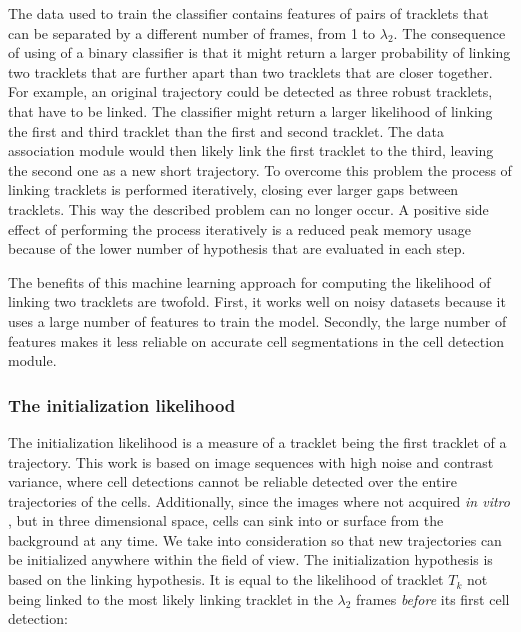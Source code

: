      	   	The data used to train the classifier contains features of pairs of tracklets that can be separated by a different number of frames, from 1 to $\lambda_2$. The consequence of using of a binary classifier is that it might return a larger probability of linking two tracklets that are further apart than two tracklets that are closer together. For example, an original trajectory could be detected as three robust tracklets, that have to be linked. The classifier might return a larger likelihood of linking the first and third tracklet than the first and second tracklet. The data association module would then likely link the first tracklet to the third, leaving the second one as a new short trajectory. To overcome this problem the process of linking tracklets is performed iteratively, closing ever larger gaps between tracklets. This way the described problem can no longer occur. A positive side effect of performing the process iteratively is a reduced peak memory usage because of the lower number of hypothesis that are evaluated in each step.  

     	   	The benefits of this machine learning approach for computing the likelihood of linking two tracklets are twofold. First, it works well on noisy datasets because it uses a large number of features to train the model. Secondly, the large number of features makes it less reliable on accurate cell segmentations in the cell detection module.
     	   	
       	\subsubsection{The initialization likelihood \statusfirstdraft}
       		
       		The initialization likelihood is a measure of a tracklet being the first tracklet of a trajectory. This work is based on image sequences with high noise and contrast variance, where cell detections cannot be reliable detected over the entire trajectories of the cells. Additionally, since the images where not acquired \textit{in vitro} , but in three dimensional space, cells can sink into or surface from the background at any time. We take into consideration so that new trajectories can be initialized anywhere within the field of view. The initialization hypothesis is based on the linking hypothesis. It is equal to the likelihood of tracklet $T_k$ not being linked to the most likely linking tracklet in the $\lambda_2$ frames \textit{before} its first cell detection:
       	
